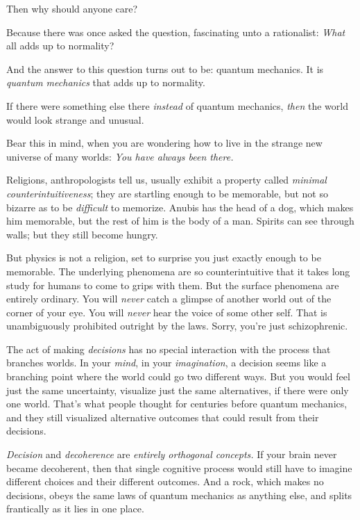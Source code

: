 {
 Then why should anyone care?}

{
 Because there was once asked the question, fascinating unto a
rationalist: \textit{What} all adds up to normality?}

{
 And the answer to this question turns out to be: quantum
mechanics. It is \textit{quantum mechanics} that adds up to normality.}

{
 If there were something else there \textit{instead} of quantum
mechanics, \textit{then} the world would look strange and unusual.}

{
 Bear this in mind, when you are wondering how to live in the
strange new universe of many worlds: \textit{You have always been
there.}}

{
 Religions, anthropologists tell us, usually exhibit a property
called \textit{minimal counterintuitiveness}; they are startling enough
to be memorable, but not so bizarre as to be \textit{difficult} to
memorize. Anubis has the head of a dog, which makes him memorable, but
the rest of him is the body of a man. Spirits can see through walls;
but they still become hungry.}

{
 But physics is not a religion, set to surprise you just exactly
enough to be memorable. The underlying phenomena are so
counterintuitive that it takes long study for humans to come to grips
with them. But the surface phenomena are entirely ordinary. You will
\textit{never} catch a glimpse of another world out of the corner of
your eye. You will \textit{never} hear the voice of some other self.
That is unambiguously prohibited outright by the laws. Sorry,
you're just schizophrenic.}

{
 The act of making \textit{decisions} has no special interaction
with the process that branches worlds. In your \textit{mind}, in your
\textit{imagination}, a decision seems like a branching point where the
world could go two different ways. But you would feel just the same
uncertainty, visualize just the same alternatives, if there were only
one world. That's what people thought for centuries
before quantum mechanics, and they still visualized alternative
outcomes that could result from their decisions.}

{
 \textit{Decision} and \textit{decoherence} are \textit{entirely
orthogonal concepts.} If your brain never became decoherent, then that
single cognitive process would still have to imagine different choices
and their different outcomes. And a rock, which makes no decisions,
obeys the same laws of quantum mechanics as anything else, and splits
frantically as it lies in one place.}

